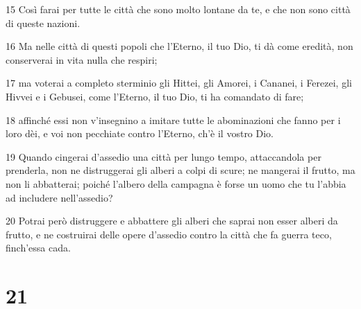 \par 15 Così farai per tutte le città che sono molto lontane da te, e che non sono città di queste nazioni.
\par 16 Ma nelle città di questi popoli che l'Eterno, il tuo Dio, ti dà come eredità, non conserverai in vita nulla che respiri;
\par 17 ma voterai a completo sterminio gli Hittei, gli Amorei, i Cananei, i Ferezei, gli Hivvei e i Gebusei, come l'Eterno, il tuo Dio, ti ha comandato di fare;
\par 18 affinché essi non v'insegnino a imitare tutte le abominazioni che fanno per i loro dèi, e voi non pecchiate contro l'Eterno, ch'è il vostro Dio.
\par 19 Quando cingerai d'assedio una città per lungo tempo, attaccandola per prenderla, non ne distruggerai gli alberi a colpi di scure; ne mangerai il frutto, ma non li abbatterai; poiché l'albero della campagna è forse un uomo che tu l'abbia ad includere nell'assedio?
\par 20 Potrai però distruggere e abbattere gli alberi che saprai non esser alberi da frutto, e ne costruirai delle opere d'assedio contro la città che fa guerra teco, finch'essa cada.

\chapter{21}

